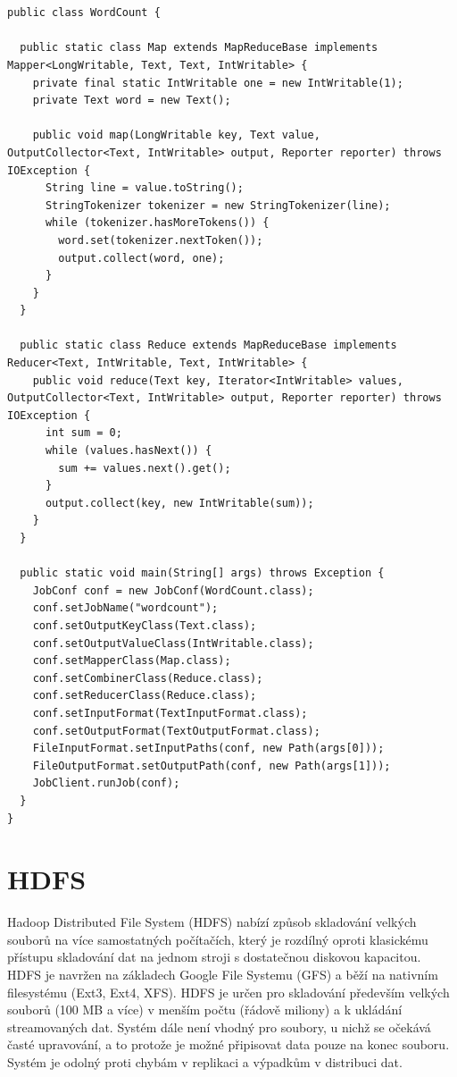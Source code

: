 \documentclass[thesis=M,czech]{FITthesis}[2012/06/26]
\begin{document}
\begin{lstlisting}[frame=single]  % Start your code-block


public class WordCount {

  public static class Map extends MapReduceBase implements Mapper<LongWritable, Text, Text, IntWritable> {
    private final static IntWritable one = new IntWritable(1);
    private Text word = new Text();

    public void map(LongWritable key, Text value, OutputCollector<Text, IntWritable> output, Reporter reporter) throws IOException {
      String line = value.toString();
      StringTokenizer tokenizer = new StringTokenizer(line);
      while (tokenizer.hasMoreTokens()) {
        word.set(tokenizer.nextToken());
        output.collect(word, one);
      }
    }
  }

  public static class Reduce extends MapReduceBase implements Reducer<Text, IntWritable, Text, IntWritable> {
    public void reduce(Text key, Iterator<IntWritable> values, OutputCollector<Text, IntWritable> output, Reporter reporter) throws IOException {
      int sum = 0;
      while (values.hasNext()) {
        sum += values.next().get();
      }
      output.collect(key, new IntWritable(sum));
    }
  }

  public static void main(String[] args) throws Exception {
    JobConf conf = new JobConf(WordCount.class);
    conf.setJobName("wordcount");
    conf.setOutputKeyClass(Text.class);
    conf.setOutputValueClass(IntWritable.class);
    conf.setMapperClass(Map.class);
    conf.setCombinerClass(Reduce.class);
    conf.setReducerClass(Reduce.class);
    conf.setInputFormat(TextInputFormat.class);
    conf.setOutputFormat(TextOutputFormat.class);
    FileInputFormat.setInputPaths(conf, new Path(args[0]));
    FileOutputFormat.setOutputPath(conf, new Path(args[1]));
    JobClient.runJob(conf);
  }
}
\end{lstlisting}

\section{HDFS}
Hadoop Distributed File System (HDFS) nabízí způsob skladování velkých souborů na více samostatných počítačích, který je rozdílný oproti klasickému přístupu skladování dat na jednom stroji s dostatečnou diskovou kapacitou. HDFS je navržen na základech Google File Systemu (GFS) a běží na nativním filesystému (Ext3, Ext4, XFS). HDFS je určen pro skladování především velkých souborů (100 MB a více) v menším počtu (řádově miliony) a k ukládání streamovaných dat. Systém dále není vhodný pro soubory, u nichž se očekává časté upravování, a to protože je možné připisovat data pouze na konec souboru. Systém je odolný proti chybám v replikaci a výpadkům v distribuci dat.\cite{HDFSWEB}
\end{document}

